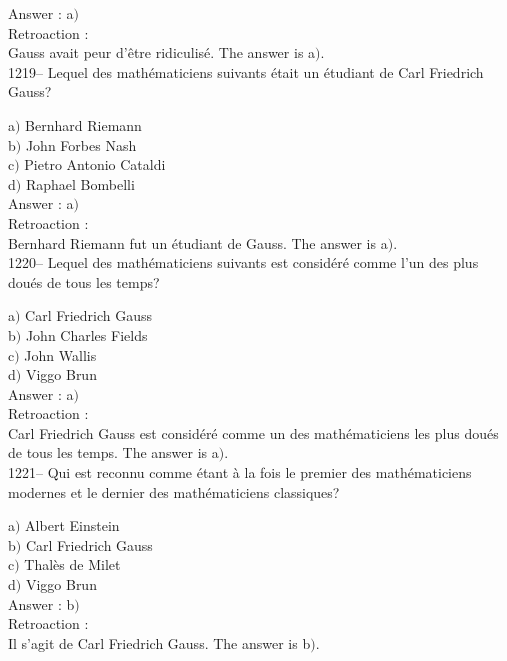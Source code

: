 ﻿\documentclass[letterpaper, 12pt]{article}
\begin{document}
Answer : a$)$\\

Retroaction :\\
Gauss avait peur d'\^etre ridiculis\'e.
The answer is a$)$.\\

1219-- Lequel des math\'ematiciens suivants \'etait un \'etudiant de
Carl Friedrich Gauss?

a$)$ Bernhard Riemann \\
b$)$ John Forbes Nash \\
c$)$ Pietro Antonio Cataldi \\
d$)$ Raphael Bombelli\\

Answer : a$)$\\

Retroaction : \\
Bernhard Riemann fut un \'etudiant de Gauss.
The answer is a$)$.\\

1220-- Lequel des math\'ematiciens suivants est consid\'er\'e comme
l'un des plus dou\'es de tous les temps?

a$)$ Carl Friedrich Gauss \\
b$)$ John Charles Fields \\
c$)$ John Wallis \\
d$)$ Viggo Brun\\

Answer : a$)$\\

Retroaction : \\
Carl Friedrich Gauss est consid\'er\'e comme un des math\'ematiciens
les plus dou\'es de tous les temps.
The answer is a$)$.\\

1221-- Qui est reconnu comme \'etant \`a la fois le premier des
math\'ematiciens modernes et le dernier des math\'ematiciens
classiques?

a$)$ Albert Einstein \\
b$)$ Carl Friedrich Gauss \\
c$)$ Thal\`es de Milet \\
d$)$ Viggo Brun\\

Answer : b$)$\\

Retroaction : \\
Il s'agit de Carl Friedrich Gauss.
The answer is b$)$.\\
\end{document}
